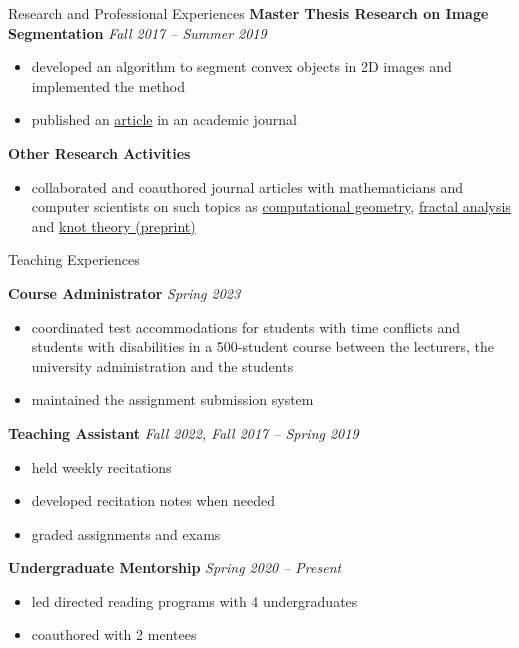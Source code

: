 \documentclass{resume} %
\begin{document}
\begin{rSection}{Research and Professional Experiences}
{\bf Master Thesis Research on Image Segmentation} \hfill {\em Fall 2017 -- Summer 2019}
\begin{itemize}
\item developed an algorithm to segment convex objects in 2D images and implemented the method
\item published an \href{https://doi.org/10.1137/19M129718X}{article} in an academic journal
\end{itemize}

{\bf Other Research Activities}
\begin{itemize}
\item collaborated and coauthored journal articles with mathematicians and computer scientists on such topics as \href{https://doi.org/10.1007/s10915-021-01569-x}{computational geometry}, \href{https://ems.press/journals/jfg/articles/10964400}{fractal analysis} and \href{https://arxiv.org/abs/1610.00898}{knot theory (preprint)}
\end{itemize}
 
\end{rSection}


\begin{rSection}{Teaching Experiences}

\textbf{Course Administrator} \hfill {\em Spring 2023}
\begin{itemize}
    \item coordinated test accommodations for students with time conflicts and students with disabilities in a 500-student course between the lecturers, the university administration and the students
    \item maintained the assignment submission system
\end{itemize}

\textbf{Teaching Assistant} \hfill {\em Fall 2022, Fall 2017 -- Spring 2019}
\begin{itemize}
    \item held weekly recitations
    \item developed recitation notes when needed
    \item graded assignments and exams
\end{itemize}

\textbf{Undergraduate Mentorship} \hfill {\em Spring 2020 -- Present}
\begin{itemize}
    \item led directed reading programs with 4 undergraduates
    \item coauthored with 2 mentees
\end{itemize}

\end{rSection}
\end{document}
